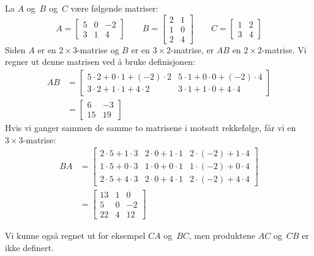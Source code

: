 \begin{ex}
La $A$ og~$B$ og~$C$ være følgende matriser:
\[
A =
\begin{bmatrix}
5 & 0 & -2 \\
3 & 1 &  4
\end{bmatrix}
\qquad
B =
\begin{bmatrix}
2 & 1 \\
1 & 0 \\
2 & 4
\end{bmatrix}
\qquad
C =
\begin{bmatrix}
1 & 2 \\
3 & 4
\end{bmatrix}
\]
Siden $A$ er en $2 \times 3$-matrise og $B$ er en
$3 \times 2$-matrise, er $AB$ en $2 \times 2$-matrise.  Vi regner ut
denne matrisen ved å bruke definisjonen:
\begin{align*}
AB
&=
\begin{bmatrix}
5 \cdot 2 + 0 \cdot 1 + (-2) \cdot 2 &
5 \cdot 1 + 0 \cdot 0 + (-2) \cdot 4 \\
3 \cdot 2 + 1 \cdot 1 +    4 \cdot 2 &
3 \cdot 1 + 1 \cdot 0 +    4 \cdot 4
\end{bmatrix}
\\
&=
\begin{bmatrix}
 6 & -3 \\
15 & 19
\end{bmatrix}
\end{align*}
Hvis vi ganger sammen de samme to matrisene i motsatt rekkefølge, får
vi en $3 \times 3$-matrise:
\begin{align*}
BA
&=
\begin{bmatrix}
2 \cdot 5 + 1 \cdot 3 &
2 \cdot 0 + 1 \cdot 1 &
2 \cdot (-2) + 1 \cdot 4 \\
1 \cdot 5 + 0 \cdot 3 &
1 \cdot 0 + 0 \cdot 1 &
1 \cdot (-2) + 0 \cdot 4 \\
2 \cdot 5 + 4 \cdot 3 &
2 \cdot 0 + 4 \cdot 1 &
2 \cdot (-2) + 4 \cdot 4
\end{bmatrix}
\\
&=
\begin{bmatrix}
13 &  1 &  0 \\
 5 &  0 & -2 \\
22 &  4 & 12
\end{bmatrix}
\end{align*}

Vi kunne også regnet ut for eksempel $CA$ og~$BC$, men produktene $AC$
og~$CB$ er ikke definert.
\end{ex}

